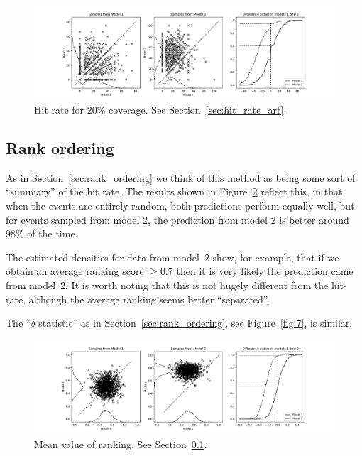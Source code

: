 \documentclass[twoside,a4paper,twocolumn,10pt]{article}
\theoremstyle{plain}
\theoremstyle{definition}
\begin{document}
\begin{figure}
  \includegraphics[width=\textwidth]{../details/hitrate2.pdf}
  \caption{Hit rate for 20\% coverage.  See Section~\ref{sec:hit_rate_art}.}
   \label{fig:5}
\end{figure}



\subsection{Rank ordering}\label{sec:rank_synth}

As in Section~\ref{sec:rank_ordering} we think of this method as being some sort of
``summary'' of the hit rate.  The results shown in Figure~\ref{fig:6} reflect this, in that
when the events are entirely random, both predictions perform equally well, but for events
sampled from model 2, the prediction from model 2 is better around 98\% of the time.

The estimated densities for data from model~2 show, for example, that
if we obtain an average ranking score $\geq 0.7$ then it is very likely the
prediction came from model~2.  It is worth noting that this is not hugely different from
the hit-rate, although the average ranking seems better ``separated''.

The ``$\delta$ statistic'' as in Section~\ref{sec:rank_ordering}, see Figure~\ref{fig:7},
is similar.

\begin{figure}
  \includegraphics[width=\textwidth]{../details/ranking1.pdf}
  \caption{Mean value of ranking.  See Section~\ref{sec:rank_synth}.}
   \label{fig:6}
\end{figure}
\end{document}
